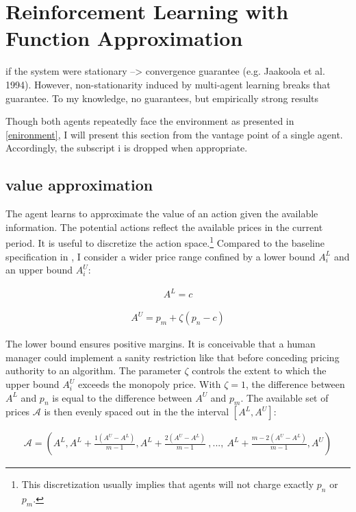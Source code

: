 \section{Reinforcement Learning with Function Approximation}

if the system were stationary --> convergence guarantee (e.g. Jaakoola et al. 1994). However, non-stationarity induced by multi-agent learning breaks that guarantee. To my knowledge, no guarantees, but empirically strong results

Though both agents repeatedly face the environment as presented in \autoref{enironment}, I will present this section from the vantage point of a single agent. Accordingly, the subscript {i} is dropped when appropriate.

\subsection{value approximation}

The agent learns to approximate the value of an action given the available information. The potential actions reflect the available prices in the current period. It is useful to discretize the action space.\footnote{This discretization usually implies that agents will not charge exactly $p_n$ or $p_m$.} Compared to the baseline specification in \textcite{calvano_artificial_2019}, I consider a wider price range confined by a lower bound $A_i^L$ and an upper bound $A_i^U$:

\begin{gather}
A^{L} = c
\end{gather}

\begin{gather}
A^{U} = p_m + \zeta (p_n - c)
\end{gather}

The lower bound ensures positive margins. It is conceivable that a human manager could implement a sanity restriction like that before conceding pricing authority to an algorithm. The parameter $\zeta$ controls the extent to which the upper bound $A_i^U$ exceeds the monopoly price. With $\zeta = 1$, the difference between $A^{L}$ and $p_n$ is equal to the difference between $A^{U}$ and $p_m$. The available set of prices $\mathcal{A}$ is then evenly spaced out in the the interval $[A^L, A^U]$:

\begin{gather}
	\mathcal{A} = (A^L, A^L + \frac{1(A^U - A^L)}{m-1}, A^L + \frac{2(A^U - A^L)}{m-1}~ , ... , ~ A^L + \frac{m-2(A^U - A^L)}{m-1}, A^U)
\end{gather}

